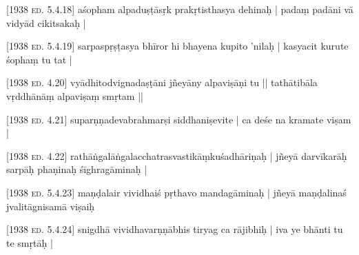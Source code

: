 \documentclass[14pt]{book}
\newcommand*{\caesura}{\linebreak}
\begin{document}
 
\pstart

                         \textsc{[1938 ed. 5.4.18]}
                        \caesura aśopham alpaduṣṭāsṛk prakṛtisthasya dehinaḥ | \caesura padaṃ padāni vā vidyād  cikitsakaḥ | 
\pend

 
\pstart

                         \textsc{[1938 ed. 5.4.19]}
                        \caesura sarpaspṛṣṭasya bhīror hi bhayena kupito 'nilaḥ | \caesura kasyacit kurute śophaṃ  tu tat | 
\pend

 
\pstart

                         \textsc{[1938 ed. 4.20]}
                        \caesura vyādhitodvignadaṣṭāni jñeyāny alpaviṣāṇi tu || \caesura tathātibāla vṛddhānāṃ  alpaviṣaṃ smṛtam || 
\pend

 
\pstart

                         \textsc{[1938 ed. 4.21]}
                        \caesura suparṇṇadevabrahmarṣi  siddhaniṣevite | \caesura {} ca deśe na kramate viṣam | 
\pend

 
\pstart

                         \textsc{[1938 ed. 4.22]}
                        \caesura rathāṅgalāṅgalacchatrasvastikāṃkuśadhāriṇaḥ | \caesura jñeyā darvīkarāḥ sarpāḥ phaṇinaḥ śīghragāminaḥ | 
\pend

 
\pstart

                         \textsc{[1938 ed. 5.4.23]}
                        \caesura maṇḍalair vividhaiś  pṛthavo mandagāminaḥ | \caesura jñeyā maṇḍalinaś  jvalitāgnisamā viṣaiḥ 
\pend

 
\pstart

                         \textsc{[1938 ed. 5.4.24]}
                        \caesura snigdhā vividhavarṇṇābhis tiryag  ca rājibhiḥ | \caesura {} iva ye bhānti  tu te smṛtāḥ | 
\pend
\end{document}
